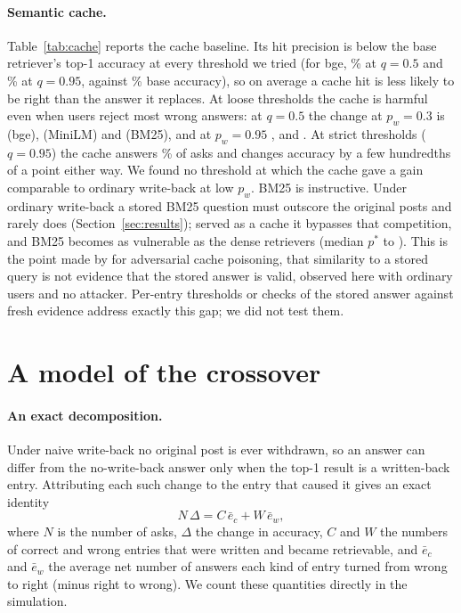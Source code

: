 \documentclass[11pt]{article}
\begin{document}
\paragraph{Semantic cache.} Table~\ref{tab:cache} reports the cache baseline. Its hit precision is below the base retriever's top-1 accuracy at every threshold we tried (for bge, \cPrecBgeH\% at $q=0.5$ and \cPrecBgeF\% at $q=0.95$, against \cBaseBge\% base accuracy), so on average a cache hit is less likely to be right than the answer it replaces. At loose thresholds the cache is harmful even when users reject most wrong answers: at $q=0.5$ the change at $p_w=0.3$ is \cTBgeH{} (bge), \cTMiniH{} (MiniLM) and \cTBmH{} (BM25), and at $p_w=0.95$ \cFBgeH, \cFMiniH{} and \cFBmH. At strict thresholds ($q=0.95$) the cache answers \cHitBgeF\% of asks and changes accuracy by a few hundredths of a point either way. We found no threshold at which the cache gave a gain comparable to ordinary write-back at low $p_w$. BM25 is instructive. Under ordinary write-back a stored BM25 question must outscore the original posts and rarely does (Section~\ref{sec:results}); served as a cache it bypasses that competition, and BM25 becomes as vulnerable as the dense retrievers (median $p^*$ \cMedBmH{} to \cMedBmF). This is the point made by \citet{simvalidity2026} for adversarial cache poisoning, that similarity to a stored query is not evidence that the stored answer is valid, observed here with ordinary users and no attacker. Per-entry thresholds \citep{schroeder2025vcache} or checks of the stored answer against fresh evidence \citep{shah2026grounded} address exactly this gap; we did not test them.

\section{A model of the crossover}
\label{sec:model}
\paragraph{An exact decomposition.} Under naive write-back no original post is ever withdrawn, so an answer can differ from the no-write-back answer only when the top-1 result is a written-back entry. Attributing each such change to the entry that caused it gives an exact identity
\begin{equation}
N\,\Delta = C\,\bar e_c + W\,\bar e_w,
\label{eq:decomp}
\end{equation}
where $N$ is the number of asks, $\Delta$ the change in accuracy, $C$ and $W$ the numbers of correct and wrong entries that were written and became retrievable, and $\bar e_c$ and $\bar e_w$ the average net number of answers each kind of entry turned from wrong to right (minus right to wrong). We count these quantities directly in the simulation.
\end{document}
